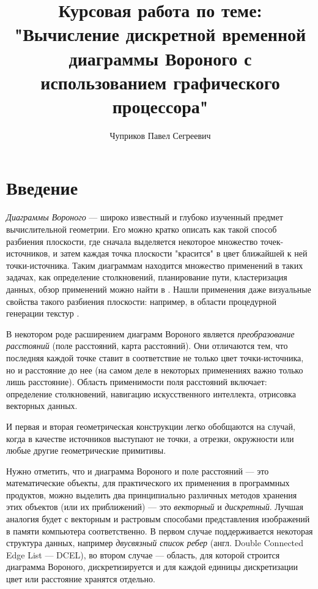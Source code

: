 \documentclass[12pt]{article}
\author{Чуприков Павел Сегреевич}
\title{Курсовая работа по теме: "Вычисление дискретной временной диаграммы 
Вороного с использованием графического процессора"}
\begin{document}
\begin{titlepage}
\maketitle
\end{titlepage}

\tableofcontents

\pagebreak

\section{Введение}
\emph{Диаграммы Вороного} --- широко известный и глубоко изученный предмет
вычислительной геометрии. Его можно кратко описать как такой способ разбиения
плоскости, где сначала выделяется некоторое множество точек-источников, и 
затем каждая точка плоскости "красится" в цвет ближайшей к ней 
точки-источника. Таким диаграммам находится множество применений в таких
задачах, как определение столкновений, планирование пути, кластеризация 
данных, обзор применений 
можно найти в \cite{survey}. Нашли применения даже визуальные свойства такого
 разбиения плоскости: например, в области процедурной генерации текстур \cite{proced}. 

В некотором роде расширением диаграмм Вороного является \emph{преобразование 
расстояний} (поле расстояний, карта расстояний). Они отличаются тем, что 
последняя каждой точке ставит в соответствие не только цвет точки-источника,
 но и расстояние до нее (на самом деле в некоторых применениях важно только 
 лишь расстояние). Область применимости поля расстояний включает: определение
  столкновений, навигацию искусственного интеллекта, отрисовка векторных данных. 

И первая и вторая геометрическая конструкции легко обобщаются на случай, когда 
в качестве источников выступают не точки, а отрезки, окружности или любые другие
 геометрические примитивы. 

Нужно отметить, что и диаграмма Вороного и поле расстояний --- это 
математические объекты, для практического их применения в программных 
продуктов, можно выделить два принципиально различных методов хранения этих
объектов (или их приближений) --- это \emph{векторный} и \emph{дискретный}.
Лучшая аналогия будет с векторным и растровым способами представления 
изображений в памяти компьютера соответственно. В первом случае 
поддерживается некоторая структура данных, например 
\emph{двусвязный список ребер} (англ. Double Connected Edge List --- DCEL),
во втором случае --- область, для которой строится диаграмма Вороного, 
дискретизируется и для каждой единицы дискретизации цвет или расстояние 
хранятся отдельно.
\end{document}
